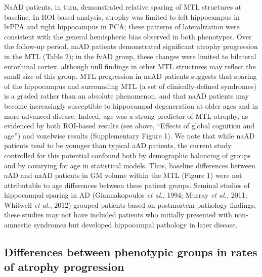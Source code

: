 \documentclass[]{article}
\begin{document}
NaAD patients, in turn, demonstrated relative sparing of MTL structures
at baseline. In ROI-based analysis, atrophy was limited to left
hippocampus in lvPPA and right hippocampus in PCA; these patterns of
lateralization were consistent with the general hemispheric bias
observed in both phenotypes. Over the follow-up period, naAD patients
demonstrated significant atrophy progression in the MTL (Table 2); in
the fvAD group, these changes were limited to bilateral entorhinal
cortex, although null findings in other MTL structures may reflect the
small size of this group. MTL progression in naAD patients suggests that
sparing of the hippocampus and surrounding MTL (a set of
clinically-defined syndromes) is a graded rather than an absolute
phenomenon, and that naAD patients may become increasingly susceptible
to hippocampal degeneration at older ages and in more advanced disease.
Indeed, age was a strong predictor of MTL atrophy, as evidenced by both
ROI-based results (see above, ``Effects of global cognition and age'')
and voxelwise results (Supplementary Figure 1). We note that while naAD
patients tend to be younger than typical aAD patients, the current study
controlled for this potential confound both by demographic balancing of
groups and by covarying for age in statistical models. Thus, baseline
differences between aAD and naAD patients in GM volume within the MTL
(Figure 1) were not attributable to age differences between these
patient groups. Seminal studies of hippocampal sparing in AD
(Giannakopoulos \emph{et al.}, 1994; Murray \emph{et al.}, 2011;
Whitwell \emph{et al.}, 2012) grouped patients based on postmortem
pathology findings; these studies may not have included patients who
initially presented with non-amnestic syndromes but developed
hippocampal pathology in later disease.

\subsection*{Differences between phenotypic groups in rates of atrophy
progression}\label{differences-between-phenotypic-groups-in-rates-of-atrophy-progression}
\end{document}

